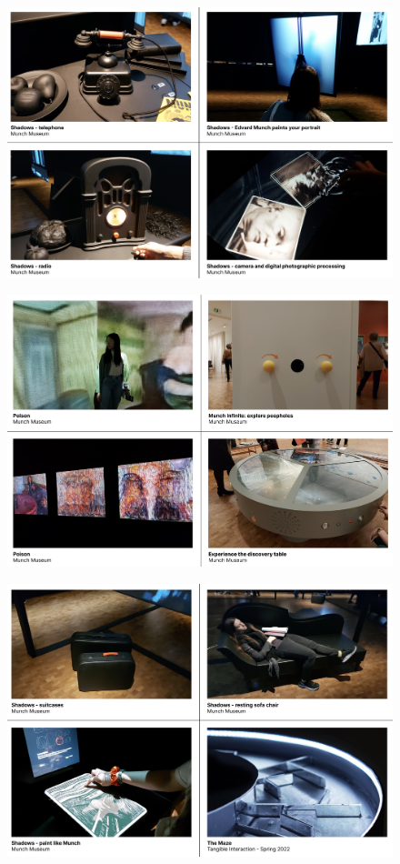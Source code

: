 \begin{figure}[H]
\includegraphics[width=13cm]{pictures/dataset/munch_1.png}
\centering 
\end{figure}

\begin{figure}[H]
\includegraphics[width=13cm]{pictures/dataset/munch_2.png}
\centering 
\end{figure}

\begin{figure}[H]
\includegraphics[width=13cm]{pictures/dataset/munch_3.png}
\centering 
\end{figure}

